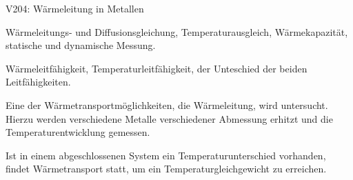 


    


    \begin{Versuch}{V204: Wärmeleitung in Metallen}
    	\begin{Stichworte}
    		Wärmeleitungs- und Diffusionsgleichung,
    		Temperaturausgleich,
    		Wärmekapazität,
    		statische und dynamische Messung.

    		Wärmeleitfähigkeit,
    		Temperaturleitfähigkeit,
    		der Unteschied der beiden Leitfähigkeiten.
    	\end{Stichworte}

        \begin{Zielsetzung}
            Eine der Wärmetransportmöglichkeiten, die Wärmeleitung, wird untersucht.
            Hierzu werden verschiedene Metalle verschiedener Abmessung erhitzt und die Temperaturentwicklung gemessen.
        \end{Zielsetzung}

        \begin{Theorie}
            Ist in einem abgeschlossenen System ein Temperaturunterschied vorhanden, 
            findet Wärmetransport statt, 
            um ein Temperaturgleichgewicht zu erreichen.


\end{Theorie}
\end{Versuch}

